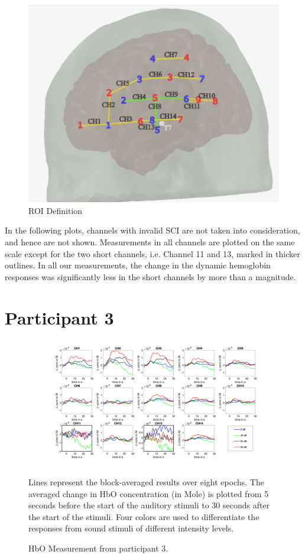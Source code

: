 \vspace{1cm}
\begin{figure}[H]
  \centering
    \includegraphics[scale=.45]{bilder/optode_roi_ink.png}
  \caption{ROI Definition}
\end{figure}


In the following plots, channels with invalid SCI are not taken into consideration, and hence are not shown. Measurements in all channels are plotted on the same scale except for the two short channels, i.e. Channel 11 and 13, marked in thicker outlines. In all our measurements, the change in the dynamic hemoglobin responses was significantly less in the short channels by more than a magnitude.
\newpage



\section {Participant 3}

\begin{figure}[H]
  \centering
    \includegraphics[scale=.4]{bilder/HbO_Mole/sub_jonas_s_HbO.png}
  \caption{HbO Measurement from participant 3.}
  \label{fig:hbo3}
  \medskip
  \footnotesize {Lines represent the block-averaged results over eight epochs. The averaged change in HbO concentration (in Mole) is plotted from 5 seconds before the start of the auditory stimuli to 30 seconds after the start of the stimuli. Four colors are used to differentiate the responses from sound stimuli of different intensity levels.}
\end{figure}

